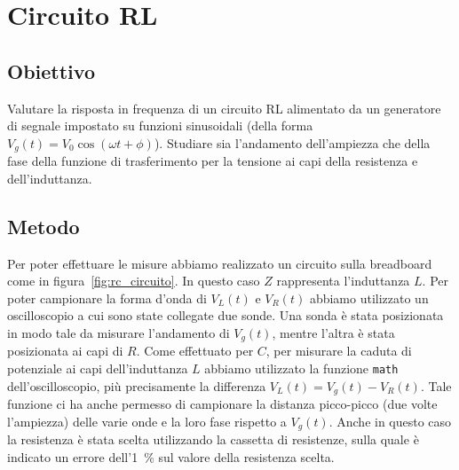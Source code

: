 \documentclass[a4paper]{article}
\begin{document}
\section{Circuito RL}
\subsection{Obiettivo}
Valutare la risposta in frequenza di un circuito RL alimentato da un generatore di segnale impostato su funzioni sinusoidali (della forma
$V_g(t) = V_{0} \cos(\omega t + \phi)$). Studiare sia l'andamento dell'ampiezza che della fase della funzione di trasferimento per la tensione ai capi della resistenza e dell'induttanza.
\subsection{Metodo}
Per poter effettuare le misure abbiamo realizzato un circuito sulla breadboard come in figura~\ref{fig:rc_circuito}. In questo caso $Z$ rappresenta l'induttanza $L$. Per poter campionare la forma d'onda di $V_L(t)$ e $V_R(t)$ abbiamo utilizzato un oscilloscopio a cui sono state collegate due sonde. Una sonda è stata posizionata in modo tale da misurare l'andamento di $V_g(t)$, mentre l'altra è stata posizionata ai capi di $R$. Come effettuato per $C$, per misurare la caduta di potenziale ai capi dell'induttanza $L$ abbiamo utilizzato la funzione \texttt{math} dell'oscilloscopio, più precisamente la differenza $V_L(t) = V_g(t) - V_R(t)$. Tale funzione ci ha anche permesso di campionare la distanza picco-picco (due volte l'ampiezza) delle varie onde e la loro fase rispetto a $V_g(t)$. Anche in questo caso la resistenza è stata scelta utilizzando la cassetta di resistenze, sulla quale è indicato un errore dell'\SI{1}{\percent} sul valore della resistenza scelta.
\end{document}
